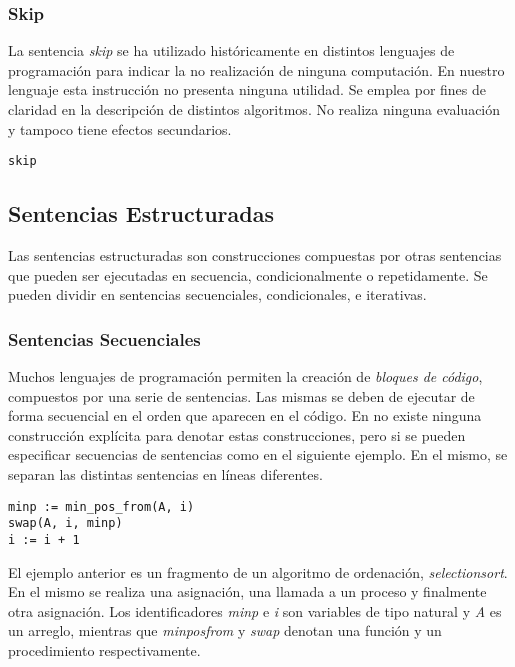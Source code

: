 \documentclass{article}
\begin{document}
\subsubsection{Skip}

La sentencia \textit{skip} se ha utilizado históricamente en distintos lenguajes de programación para indicar la no realización de ninguna computación.
En nuestro lenguaje esta instrucción no presenta ninguna utilidad.
Se emplea por fines de claridad en la descripción de distintos algoritmos.
No realiza ninguna evaluación y tampoco tiene efectos secundarios.

\begin{lstlisting}
skip
\end{lstlisting}

\subsection{Sentencias Estructuradas}

Las sentencias estructuradas son construcciones compuestas por otras sentencias que pueden ser ejecutadas en secuencia, condicionalmente o repetidamente.
Se pueden dividir en sentencias secuenciales, condicionales, e iterativas.

\subsubsection{Sentencias Secuenciales}

Muchos lenguajes de programación permiten la creación de \textit{bloques de código}, compuestos por una serie de sentencias.
Las mismas se deben de ejecutar de forma secuencial en el orden que aparecen en el código.
En \Lang\space no existe ninguna construcción explícita para denotar estas construcciones, pero si se pueden especificar secuencias de sentencias como en el siguiente ejemplo.
En el mismo, se separan las distintas sentencias en líneas diferentes.

\begin{lstlisting}
minp := min_pos_from(A, i)
swap(A, i, minp)
i := i + 1
\end{lstlisting}

El ejemplo anterior es un fragmento de un algoritmo de ordenación, \textit{selection\gbajo sort}.
En el mismo se realiza una asignación, una llamada a un proceso y finalmente otra asignación.
Los identificadores \textit{minp} e \textit{i} son variables de tipo natural y \textit{A} es un arreglo, mientras que \textit{min\gbajo pos\gbajo from} y \textit{swap} denotan una función y un procedimiento respectivamente.
\end{document}
